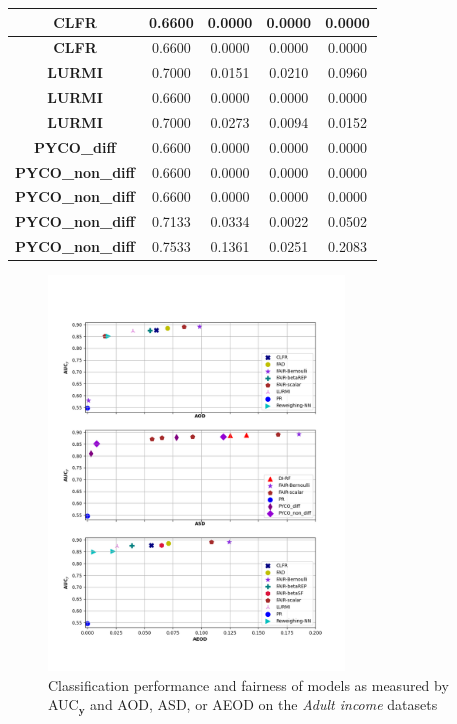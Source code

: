 \documentclass[preprint,12pt]{elsarticle}
\begin{document}
\begin{table}
\begin{tabular}{|c|c|c|c|c|}
		\textbf{CLFR}            & 0.6600       & 0.0000       & 0.0000       & 0.0000        \\ \hline
		\textbf{CLFR}            & 0.6600       & 0.0000       & 0.0000       & 0.0000        \\ \hline
		\textbf{LURMI}           & 0.7000       & 0.0151       & 0.0210       & 0.0960        \\ \hline
		\textbf{LURMI}           & 0.6600       & 0.0000       & 0.0000       & 0.0000        \\ \hline
		\textbf{LURMI}           & 0.7000       & 0.0273       & 0.0094       & 0.0152        \\ \hline
		\textbf{PYCO\_diff}      & 0.6600       & 0.0000       & 0.0000       & 0.0000        \\ \hline
		\textbf{PYCO\_non\_diff} & 0.6600       & 0.0000       & 0.0000       & 0.0000        \\ \hline
		\textbf{PYCO\_non\_diff} & 0.6600       & 0.0000       & 0.0000       & 0.0000        \\ \hline
		\textbf{PYCO\_non\_diff} & 0.7133       & 0.0334       & 0.0022       & 0.0502        \\ \hline
		\textbf{PYCO\_non\_diff} & 0.7533       & 0.1361       & 0.0251       & 0.2083        \\ \hline
	\end{tabular}
	\label{tab:Ger-sex}%
\end{table}

\iffalse
\begin{figure}
	\center
	\includegraphics[angle=0, width=0.7\textwidth]{Adult.png}
	\captionsetup{justification=centering}
	\caption{Classification performance and fairness of models as measured by AUC$_\mathbf{y}$ and AOD, ASD, or AEOD on the \textit{Adult income} datasets}
	\label{fig:Adult1}
	\vskip -0.2in
\end{figure}
\end{document}
